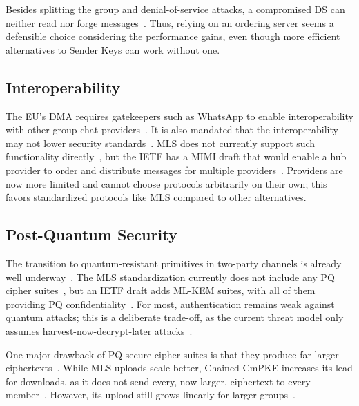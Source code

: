 \documentclass[conference]{IEEEtran}
\begin{document}
Besides splitting the group and denial-of-service attacks, a compromised \ac{DS} can neither read nor forge messages~\cite{beurdoucheMessagingLayerSecurity2025}.
Thus, relying on an ordering server seems a defensible choice considering the performance gains, even though more efficient alternatives to Sender Keys can work without one.

\subsection{Interoperability}\label{sec:interop}
The EU's \ac{DMA} requires gatekeepers such as WhatsApp to enable interoperability with other group chat providers~\cite{RegulationEU20222022}.
It is also mandated that the interoperability may not lower security standards~\cite{RegulationEU20222022}.
\ac{MLS} does not currently support such functionality directly~\cite{beurdoucheMessagingLayerSecurity2025}, but the \ac{IETF} has a \ac{MIMI} draft that would enable a hub provider to order and distribute messages for multiple providers~\cite{barnesMoreInstantMessaging2026}.
Providers are now more limited and cannot choose protocols arbitrarily on their own; this favors standardized protocols like \ac{MLS} compared to other alternatives.

\subsection{Post-Quantum Security}\label{sec:pq}
The transition to quantum-resistant primitives in two-party channels is already well underway~\cite{kretPQXDHKeyAgreement,perrinDoubleRatchetAlgorithm}.
The \ac{MLS} standardization currently does not include any \ac{PQ} cipher suites~\cite{barnesMessagingLayerSecurity2023}, but an \ac{IETF} draft adds ML-KEM suites, with all of them providing \ac{PQ} confidentiality~\cite{mahyMLKEMHybridCipher2026}.
For most, authentication remains weak against quantum attacks; this is a deliberate trade-off, as the current threat model only assumes harvest-now-decrypt-later attacks~\cite{mahyMLKEMHybridCipher2026}.

One major drawback of PQ-secure cipher suites is that they produce far larger ciphertexts~\cite{hashimotoConcreteTreatmentEfficient2021,perrinDoubleRatchetAlgorithm}.
While \ac{MLS} uploads scale better, Chained CmPKE increases its lead for downloads, as it does not send every, now larger, ciphertext to every member~\cite{hashimotoConcreteTreatmentEfficient2021}.
However, its upload still grows linearly for larger groups~\cite{hashimotoConcreteTreatmentEfficient2021}.
\end{document}
